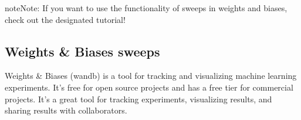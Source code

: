 \documentclass[letterpaper,10pt,english]{sphinxmanual}
\begin{document}
\begin{sphinxVerbatim}[commandchars=\\\{\}]
     

  
  \PYG{p}{[}  \PYG{p}{]}

   
    

\end{sphinxVerbatim}

\begin{sphinxadmonition}{note}{Note:}
\sphinxAtStartPar
If you want to use the functionality of sweeps in weights and biases, check out the designated tutorial!
\end{sphinxadmonition}


\subsection{Weights \& Biases sweeps}
\label{\detokenize{weights_and_biases_sweeps:weights-biases-sweeps}}\label{\detokenize{weights_and_biases_sweeps::doc}}
\sphinxAtStartPar
Weights \& Biases (wandb) is a tool for tracking and visualizing machine learning experiments.
It’s free for open source projects and has a free tier for commercial projects.
It’s a great tool for tracking experiments, visualizing results, and sharing results with collaborators.
\end{document}
